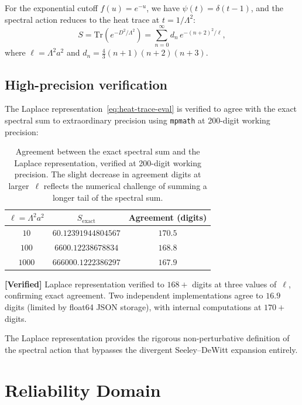 \documentclass[11pt,a4paper]{article}
\newcommand{\Lam}{\Lambda}
\theoremstyle{plain}
\theoremstyle{definition}
\newcommand{\verified}[1]{%
  \par\smallskip\noindent
  \colorbox{green!10}{\parbox{\dimexpr\linewidth-2\fboxsep}{%
    \textcolor{green!50!black}{\textbf{[Verified]}} #1}}%
  \par\smallskip}
\begin{document}
For the exponential cutoff $f(u) = e^{-u}$, we have $\psi(t) = \delta(t-1)$,
and the spectral action reduces to the heat trace at $t = 1/\Lam^2$:
\begin{equation}\label{eq:heat-trace-eval}
  S = \mathrm{Tr}\!\left(e^{-D^2/\Lam^2}\right)
  = \sum_{n=0}^{\infty} d_n\, e^{-(n+2)^2/\ell},
\end{equation}
where $\ell = \Lam^2 a^2$ and $d_n = \tfrac{4}{3}(n+1)(n+2)(n+3)$.

\subsection{High-precision verification}

The Laplace representation~\eqref{eq:heat-trace-eval} is verified to agree
with the exact spectral sum to extraordinary precision using
\texttt{mpmath} at 200-digit working precision:

\begin{table}[h]
\centering
\begin{tabular}{ccc}
\toprule
$\ell = \Lam^2 a^2$ & $S_{\text{exact}}$ & Agreement (digits) \\
\midrule
$10$ & $60.12391944804567$ & $170.5$ \\
$100$ & $6600.12238678834$ & $168.8$ \\
$1000$ & $666000.1222386297$ & $167.9$ \\
\bottomrule
\end{tabular}
\caption{Agreement between the exact spectral sum and the Laplace
representation, verified at 200-digit working precision.  The slight
decrease in agreement digits at larger~$\ell$ reflects the numerical
challenge of summing a longer tail of the spectral sum.}
\label{tab:laplace-verification}
\end{table}

\verified{Laplace representation verified to $168{+}$ digits
at three values of~$\ell$, confirming exact agreement.
Two independent implementations agree to
$16.9$ digits (limited by float64 JSON storage), with internal
computations at $170{+}$ digits.}

The Laplace representation provides the rigorous non-perturbative definition
of the spectral action that bypasses the divergent Seeley--DeWitt expansion
entirely.


\section{Reliability Domain}\label{sec:reliability}
\end{document}
